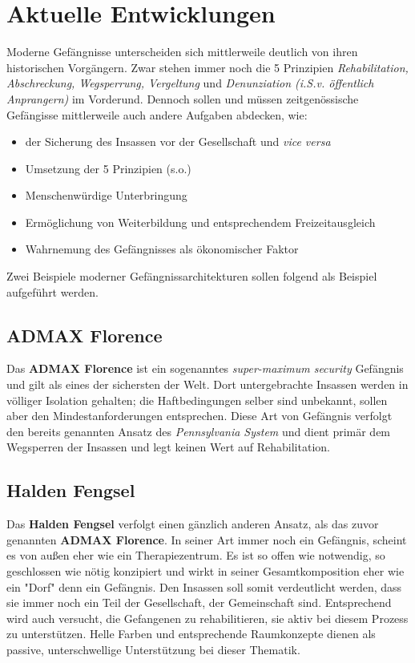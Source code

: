 \section{Aktuelle Entwicklungen}

Moderne Gefängnisse unterscheiden sich mittlerweile deutlich von ihren historischen Vorgängern. Zwar stehen immer noch die 5 Prinzipien \textit{Rehabilitation, Abschreckung, Wegsperrung, Vergeltung} und \textit{Denunziation (i.S.v. öffentlich Anprangern)} im Vorderund. Dennoch sollen und müssen zeitgenössische Gefängisse mittlerweile auch andere Aufgaben abdecken, wie: 
\begin{itemize}
	\item der Sicherung des Insassen vor der Gesellschaft und \textit{vice versa}
	\item Umsetzung der 5 Prinzipien (s.o.)
	\item Menschenwürdige Unterbringung
	\item Ermöglichung von Weiterbildung und entsprechendem Freizeitausgleich
	\item Wahrnemung des Gefängnisses als ökonomischer Faktor
\end{itemize}

Zwei Beispiele moderner Gefängnissarchitekturen sollen folgend als Beispiel aufgeführt werden.

\subsection{ADMAX Florence}
Das \textbf{ADMAX Florence} ist ein sogenanntes \textit{super-maximum security} Gefängnis und gilt als eines der sichersten der Welt. Dort untergebrachte Insassen werden in völliger Isolation gehalten; die Haftbedingungen selber sind unbekannt, sollen aber den Mindestanforderungen entsprechen. Diese Art von Gefängnis verfolgt den bereits genannten Ansatz des \textit{Pennsylvania System} und dient primär dem Wegsperren der Insassen und legt keinen Wert auf Rehabilitation.

\subsection{Halden Fengsel}
Das \textbf{Halden Fengsel} verfolgt einen gänzlich anderen Ansatz, als das zuvor genannten \textbf{ADMAX Florence}. In seiner Art immer noch ein Gefängnis, scheint es von außen eher wie ein Therapiezentrum. Es ist so offen wie notwendig, so geschlossen wie nötig konzipiert und wirkt in seiner Gesamtkomposition eher wie ein "Dorf" denn ein Gefängnis. Den Insassen soll somit verdeutlicht werden, dass sie immer noch ein Teil der Gesellschaft, der Gemeinschaft sind. Entsprechend wird auch versucht, die Gefangenen zu rehabilitieren, sie aktiv bei diesem Prozess zu unterstützen. 
Helle Farben und entsprechende Raumkonzepte dienen als passive, unterschwellige Unterstützung bei dieser Thematik.
